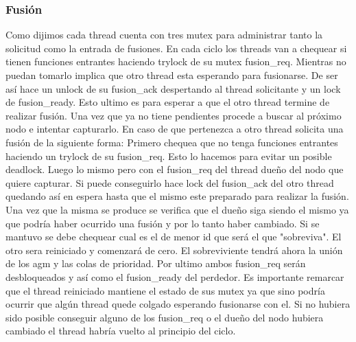 \subsubsection{Fusión}

Como dijimos cada thread cuenta con tres mutex para administrar tanto la solicitud como la entrada de fusiones. En cada ciclo los threads van a chequear si tienen funciones entrantes haciendo trylock de su mutex fusion\_req. Mientras no puedan tomarlo implica que otro thread esta esperando para fusionarse. De ser así hace un unlock de su fusion\_ack despertando al thread solicitante y un lock de fusion\_ready. Esto ultimo es para esperar a que el otro thread termine de realizar fusión. Una vez que ya no tiene pendientes procede a buscar al próximo nodo e intentar capturarlo. En caso de que pertenezca a otro thread solicita una fusión de la siguiente forma: Primero chequea que no tenga funciones entrantes haciendo un trylock de su fusion\_req. Esto lo hacemos para evitar un posible deadlock. Luego lo mismo pero con el fusion\_req del thread dueño del nodo que quiere capturar. Si puede conseguirlo hace lock del fusion\_ack del otro thread quedando así en espera hasta que el mismo este preparado para realizar la fusión. Una vez que la misma se produce se verifica que el dueño siga siendo el mismo ya que podría haber ocurrido una fusión y por lo tanto haber cambiado. Si se mantuvo se debe chequear cual es el de menor id que será el que "sobreviva". El otro sera reiniciado y comenzará de cero. El sobreviviente tendrá ahora la unión de los agm y las colas de prioridad. Por ultimo ambos fusion\_req serán desbloqueados y así como el fusion\_ready del perdedor. Es importante remarcar que el thread reiniciado mantiene el estado de sus mutex ya que sino podría ocurrir que algún thread quede colgado esperando fusionarse con el. Si no hubiera sido posible conseguir alguno de los fusion\_req o el dueño del nodo hubiera cambiado el thread habría vuelto al principio del ciclo.

